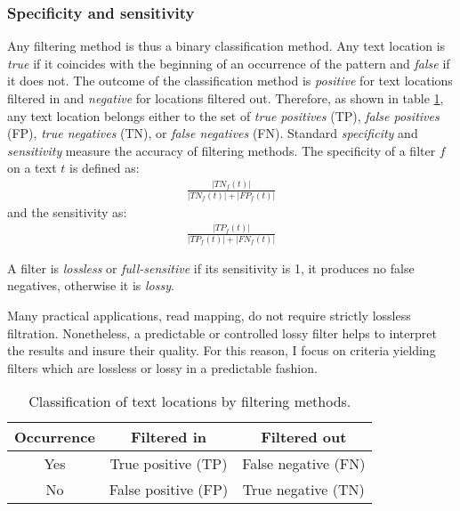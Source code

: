 \subsubsection{Specificity and sensitivity}
\label{intro:filtering:spec-sens}

Any filtering method is thus a binary classification method.
Any text location is \emph{true} if it coincides with the beginning of an occurrence of the pattern and \emph{false} if it does not.
The outcome of the classification method is \emph{positive} for text locations filtered in and \emph{negative} for locations filtered out.
Therefore, as shown in table \ref{tab:filter:accuracy}, any text location belongs either to the set of \emph{true positives} (TP), \emph{false positives} (FP), \emph{true negatives} (TN), or \emph{false negatives} (FN).
Standard \emph{specificity} and \emph{sensitivity} measure the accuracy of filtering methods.
The specificity of a filter $f$ on a text $t$ is defined as:
\begin{eqnarray}
\frac{|TN_f(t)|}{|TN_f(t)| + |FP_f(t)|}
\end{eqnarray}
and the sensitivity as:
\begin{eqnarray}
\frac{|TP_f(t)|}{|TP_f(t)| + |FN_f(t)|}
\end{eqnarray}

\begin{definition}
A filter is \emph{lossless} or \emph{full-sensitive} if its sensitivity is 1, \ie it produces no false negatives, otherwise it is \emph{lossy}.
\end{definition}
Many practical applications, \eg read mapping, do not require strictly lossless filtration.
Nonetheless, a predictable or controlled lossy filter helps to interpret the results and insure their quality.
For this reason, I focus on criteria yielding filters which are lossless or lossy in a predictable fashion.

\begin{table}[h]
\begin{center}
\caption[Classification of text locations by filtering methods]{Classification of text locations by filtering methods.}
\begin{tabular}{ccc}
\toprule
Occurrence & Filtered in & Filtered out\\
\midrule
Yes & True positive (TP) & False negative (FN) \\
No & False positive (FP) & True negative (TN) \\
\bottomrule
\end{tabular}
\label{tab:filter:accuracy}
\end{center}
\end{table}

